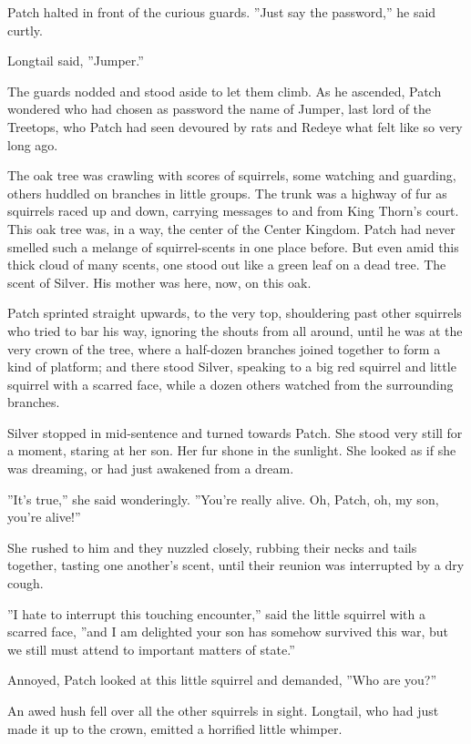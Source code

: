 \documentclass[12pt]{book}
\begin{document}
Patch halted in front of the curious guards. ''Just say the password,'' he said curtly.

Longtail said, ''Jumper.''

The guards nodded and stood aside to let them climb. As he ascended, Patch wondered who had chosen as password the name of Jumper, last lord of the Treetops, who Patch had seen devoured by rats and Redeye what felt like so very long ago.

The oak tree was crawling with scores of squirrels, some watching and guarding, others huddled on branches in little groups. The trunk was a highway of fur as squirrels raced up and down, carrying messages to and from King Thorn's court. This oak tree was, in a way, the center of the Center Kingdom. Patch had never smelled such a melange of squirrel-scents in one place before. But even amid this thick cloud of many scents, one stood out like a green leaf on a dead tree. The scent of Silver. His mother was here, now, on this oak.

Patch sprinted straight upwards, to the very top, shouldering past other squirrels who tried to bar his way, ignoring the shouts from all around, until he was at the very crown of the tree, where a half-dozen branches joined together to form a kind of platform; and there stood Silver, speaking to a big red squirrel and little squirrel with a scarred face, while a dozen others watched from the surrounding branches.

Silver stopped in mid-sentence and turned towards Patch. She stood very still for a moment, staring at her son. Her fur shone in the sunlight. She looked as if she was dreaming, or had just awakened from a dream.

''It's true,'' she said wonderingly. ''You're really alive. Oh, Patch, oh, my son, you're alive!''

She rushed to him and they nuzzled closely, rubbing their necks and tails together, tasting one another's scent, until their reunion was interrupted by a dry cough.

''I hate to interrupt this touching encounter,'' said the little squirrel with a scarred face, ''and I am delighted your son has somehow survived this war, but we still must attend to important matters of state.''

Annoyed, Patch looked at this little squirrel and demanded, ''Who are you?''

An awed hush fell over all the other squirrels in sight. Longtail, who had just made it up to the crown, emitted a horrified little whimper.
\end{document}
